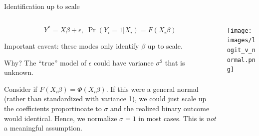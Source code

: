 \documentclass[notes,11pt, aspectratio=169]{beamer}
\newenvironment{wideitemize}{\itemize\addtolength{\itemsep}{10pt}}{\enditemize}
\begin{document}
  \begin{frame}{Identification up to scale}
  \begin{columns}[T] %
    \begin{column}{.6\textwidth}
  $$Y^{*} = X\beta + \epsilon,  \; \Pr(Y_{i} =1|X_{i}) = F(X_{i}\beta)  $$

  \begin{wideitemize}
  \item  Important caveat: these modes only identify $\beta$  up to scale.
  \item   Why?  The ``true'' model of $\epsilon$ could have variance
    $\sigma^{2}$ that is unknown.
  \item Consider if $F(X_{i}\beta) = \Phi(X_{i}\beta)$. If this were a
    general normal (rather than standardized with variance 1), we
    could just scale up the coefficients proportinoate to $\sigma$ and
    the realized binary outcome would identical.  Hence, we normalize
    $\sigma = 1$ in most cases. This is \emph{not} a meaningful
    assumption.
  \end{wideitemize}

    \end{column}%
  \hfill%
  \begin{column}{.4\textwidth}
    \begin{center}
      \texttt{[image: images/logit\_v\_normal.png]}
    \end{center}
  \end{column}
\end{columns}
  \end{frame}
\end{document}
